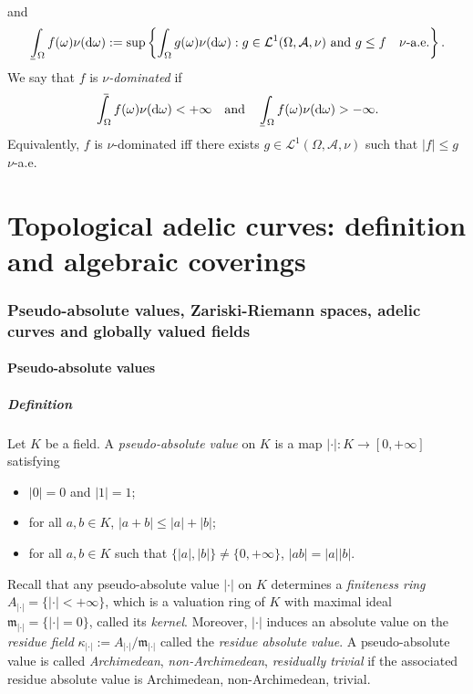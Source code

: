 \documentclass [11pt,reqno]{amsart}
\newcommand{\1}{\mathmybb{1}}
\def\cA{{\mathcal{A}}}
\def\cL{{\mathcal{L}}}
\def\m{\mathfrak m}
\def\diff{\mathrm{d}}
\def\upint{\mathchoice%
    {\mkern13mu\overline{\vphantom{\intop}\mkern7mu}\mkern-20mu}%
    {\mkern7mu\overline{\vphantom{\intop}\mkern7mu}\mkern-14mu}%
    {\mkern7mu\overline{\vphantom{\intop}\mkern7mu}\mkern-14mu}%
    {\mkern7mu\overline{\vphantom{\intop}\mkern7mu}\mkern-14mu}%
  \int}
\def\lowint{\mkern3mu\underline{\vphantom{\intop}\mkern7mu}\mkern-10mu\int}
\begin{document}
\begin{itemize}
\begin{align*}
\end{align*}
and 
\begin{align*}
\lowint_{\Omega} f(\omega)\nu(\diff\omega) := \sup\left\{\int_{\Omega}g(\omega)\nu(\diff\omega) : g\in \cL^{1}(\Omega,\cA,\nu) \text{ and } g \leq f \quad\nu\text{-a.e.}\right\}.
\end{align*}
We say that $f$ is $\nu$\emph{-dominated} if
\begin{align*}
\upint_{\Omega} f(\omega)\nu(\diff\omega) <+\infty \quad \text{and} \quad \lowint_{\Omega} f(\omega)\nu(\diff\omega)>-\infty.
\end{align*}
Equivalently, $f$ is $\nu$-dominated iff there exists $g\in\cL^1(\Omega,\cA,\nu)$ such that $|f|\leq g$ $\nu$-a.e.
\end{itemize}

\part{Topological adelic curves: definition and algebraic coverings}
\label{part:tac}

\section{Pseudo-absolute values, Zariski-Riemann spaces, adelic curves and globally valued fields}
\label{sec:prelim}

\subsection{Pseudo-absolute values}

\subsubsection{Definition}
Let $K$ be a field. A \emph{pseudo-absolute value} on $K$ is a map $|\cdot|:K\to[0,+\infty]$ satisfying 
\begin{itemize}
	\item[(i)] $|0|=0$ and $|1|=1$;
	\item[(ii)] for all $a,b\in K$, $|a+b| \leq |a|+|b|$;
	\item[(iii)] for all $a,b\in K$ such that $\{|a|,|b|\}\neq \{0,+\infty\}$, $|ab| = |a||b|$. 
\end{itemize}
Recall that any pseudo-absolute value $|\cdot|$ on $K$ determines a \emph{finiteness ring} $A_{|\cdot|}=\{|\cdot|<+\infty\}$, which is a valuation ring of $K$ with maximal ideal $\m_{|\cdot|}=\{|\cdot|=0\}$, called its \emph{kernel}. Moreover, $|\cdot|$ induces an absolute value on the \emph{residue field} $\kappa_{|\cdot|}:=A_{|\cdot|}/\m_{|\cdot|}$ called the \emph{residue absolute value}. A pseudo-absolute value is called \emph{Archimedean}, \emph{non-Archimedean}, \emph{residually trivial} if the associated residue absolute value is Archimedean, non-Archimedean, trivial. 
\end{document}
